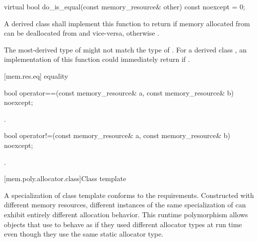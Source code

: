 %
\begin{itemdecl}
virtual bool do_is_equal(const memory_resource& other) const noexcept = 0;
\end{itemdecl}

\begin{itemdescr}
\pnum
\returns
A derived class shall implement this function to return  if memory allocated from  can be deallocated from  and vice-versa,
otherwise .
\begin{note}
The most-derived type of  might not match the type of .
For a derived class , an implementation of this function
could immediately return 
if .\end{note}
\end{itemdescr}

[mem.res.eq]{ equality}

%
\begin{itemdecl}
bool operator==(const memory_resource& a, const memory_resource& b) noexcept;
\end{itemdecl}

\begin{itemdescr}
\pnum
\returns
{}.
\end{itemdescr}

%
\begin{itemdecl}
bool operator!=(const memory_resource& a, const memory_resource& b) noexcept;
\end{itemdecl}

\begin{itemdescr}
\pnum
\returns
{}.
\end{itemdescr}

[mem.poly.allocator.class]{Class template }

\pnum
A specialization of class template 
conforms to the  requirements.
Constructed with different memory resources,
different instances of the same specialization of 
can exhibit entirely different allocation behavior.
This runtime polymorphism allows objects that use 
to behave as if they used different allocator types at run time
even though they use the same static allocator type.

